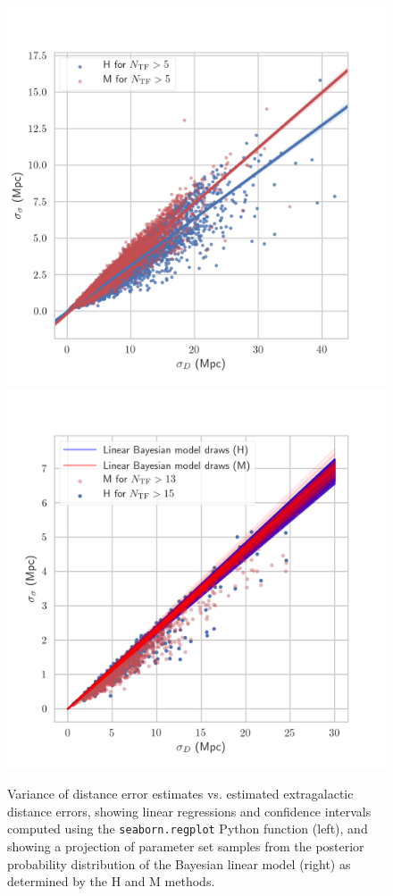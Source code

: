 \documentclass[a4paper,fleqn,usenatbib]{mnras}
\begin{document}
\begin{figure}
	\includegraphics[scale=0.69]{f20ee.png}
	\includegraphics[scale=0.69]{f21drawsee.png}
    \caption{Variance of distance error estimates vs. estimated extragalactic distance errors, showing linear regressions and confidence intervals computed using the \texttt{seaborn.regplot} Python function (left), and showing a projection of parameter set samples from the posterior probability distribution of the Bayesian linear model (right) as determined by the H and M methods.}
    \label{fig:drawsee}
\end{figure}
\end{document}
